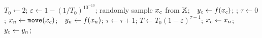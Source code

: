 \Procedure{\fsa}{$\objFun:\solutionSpace\mapsto\naturalNumbers$}%
%
\State {}%
\State $T_0\gets 2$; $\varepsilon\gets 1 - (1/T_0)^{10^{-10}}$;%
\State randomly sample $\mbox{\ensuremath{x_{c}}}$ from $\mathbb{X}$;~~$\mbox{\ensuremath{y_{c}}} \gets \mbox{\ensuremath{f\!\left(\mbox{\ensuremath{x_{c}}}\right)}}$;%
\State {}; $\tau\gets 0$;%
%
%
\State $\mbox{\ensuremath{x_{n}}} \gets \texttt{move}(\mbox{\ensuremath{x_{c}}})$;~~$\mbox{\ensuremath{y_{n}}} \gets \mbox{\ensuremath{f\!\left(\mbox{\ensuremath{x_{n}}}\right)}}$;%
%
\State {}%
%
\State $\tau\gets \tau+1$; $T\gets T_0(1-\varepsilon)^{\tau-1}$;%
%
%
\State $\mbox{\ensuremath{x_{c}}} \gets \mbox{\ensuremath{x_{n}}}$;~~$\mbox{\ensuremath{y_{c}}} \gets \mbox{\ensuremath{y_{n}}}$;%
\EndIf%
%
\smallskip%
\EndIf%
%
\EndWhile%
\Return \bestcolor{\bestSoFarX, \bestSoFarF}%
\EndProcedure%